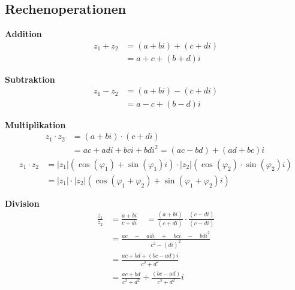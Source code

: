 \documentclass[german]{latex4ei/latex4ei_sheet}
\begin{document}
\begin{sectionbox}

\subsection{Rechenoperationen}
\begin{minipage}{0.49\textwidth}
	\textbf{Addition}
\begin{align*}
	 { z }_{ 1 } + { z }_{ 2 } &= \left(a + bi\right) + \left(c + di \right)\\
	 &= a + c + (b + d)i
	\end{align*}
\end{minipage}
\begin{minipage}{0.49\textwidth}
	\textbf{Subtraktion}
	\begin{align*}
	 { z }_{ 1 } - { z }_{ 2 } &= \left(a + bi \right) - \left(c + di \right)\\
	 &= a - c + (b - d)i
	\end{align*}
\end{minipage}

\textbf{Multiplikation}
\begin{align*}
	 { z }_{ 1 } \cdot  { z }_{ 2 } &= \left(a + bi \right) \cdot \left(c + di \right) \\
	 &= ac + adi + bci + bd { i }^{ 2 }= \left(ac - bd\right) + \left(ad + bc\right)i\
	\end{align*}
	\begin{align*}
	{ z }_{ 1 }\cdot { z }_{ 2 } & =\left| { z }_{ 1 } \right| \left( \cos { \left( { \varphi  }_{ 1 } \right)  } +\sin { \left( { \varphi  }_{ 1 } \right)  } i \right) \cdot \left| { z }_{ 2 } \right| \left( \cos { \left( { \varphi  }_{ 2 } \right)  } \cdot \sin { \left( { \varphi  }_{ 2 } \right)  } i \right) \\ 
	& =\left| { z }_{ 1 } \right| \cdot \left| { z }_{ 2 } \right| \left( \cos { \left( { \varphi  }_{ 1 } + { \varphi  }_{ 2 } \right)  } +\sin { \left( { \varphi  }_{ 1 } + { \varphi  }_{ 2 } \right)  } i \right)
	\end{align*}

\textbf{Division}
\begin{align*}
\frac { z_{ 1 } }{ z_{ 2 } } &=\frac { a+bi }{ c+di } \quad =\frac { \left( a+bi \right)  }{ \left( c+di \right)  } \cdot \frac { \left( c-di \right)  }{ \left( c-di \right)  } \\ 
&=\frac { ac\quad -\quad adi\quad +\quad bci\quad -\quad bd{ i }^{ 2 } }{ { c }^{ 2 }-{ \left( di \right)  }^{ 2 } } \\ 
&=\frac { ac+bd+\left( bc-ad \right) i }{ { c }^{ 2 }+{ d }^{ 2 } } \\ 
&=\frac { ac+bd }{ { c }^{ 2 }+{ d }^{ 2 } } +\frac { \left( bc-ad \right)  }{ { c }^{ 2 }+{ d }^{ 2 } }  i
\end{align*}


\end{sectionbox}
\end{document}
